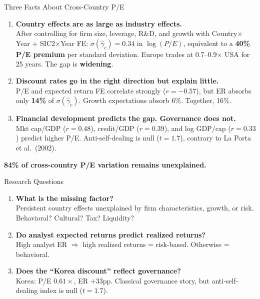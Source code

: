 \documentclass[aspectratio=169, 11pt]{beamer}
\begin{document}
\begin{frame}{Three Facts About Cross-Country P/E}
\vspace{0.1cm}
\begin{enumerate}\setlength\itemsep{8pt}

\item[\textcolor{accent}{\Large 1.}] {\large \textbf{Country effects are as large as industry effects.}}\\[2pt]
\footnotesize After controlling for firm size, leverage, R\&D, and growth with Country$\times$Year + SIC2$\times$Year FE: $\sigma(\hat\gamma_c) = 0.34$ in $\log(P/E)$, equivalent to a \textcolor{alert}{\textbf{40\% P/E premium}} per standard deviation. Europe trades at 0.7--0.9$\times$ USA for 25 years. The gap is \textbf{widening}.

\item[\textcolor{accent}{\Large 2.}] {\large \textbf{Discount rates go in the right direction but explain little.}}\\[2pt]
\footnotesize P/E and expected return FE correlate strongly ($r = -0.57$), but ER absorbs only \textcolor{alert}{\textbf{14\%}} of $\sigma(\hat\gamma_c)$. Growth expectations absorb 6\%. Together, 16\%.

\item[\textcolor{accent}{\Large 3.}] {\large \textbf{Financial development predicts the gap. Governance does not.}}\\[2pt]
\footnotesize Mkt cap/GDP ($r = 0.48$), credit/GDP ($r = 0.39$), and log GDP/cap ($r = 0.33$) predict higher P/E. Anti-self-dealing is null ($t = 1.7$), contrary to La Porta et al.\ (2002).

\end{enumerate}

\vspace{0.15cm}
\centering
\colorbox{alert!15}{\footnotesize \textbf{84\% of cross-country P/E variation remains unexplained.}}
\end{frame}

\begin{frame}{Research Questions}
\small
\begin{enumerate}\setlength\itemsep{2pt}
\item \textbf{What is the missing factor?}\\
{\footnotesize Persistent country effects unexplained by firm characteristics, growth, or risk. Behavioral? Cultural? Tax? Liquidity?}

\item \textbf{Do analyst expected returns predict realized returns?}\\
{\footnotesize High analyst ER $\Rightarrow$ high realized returns = risk-based. Otherwise = behavioral.}

\item \textbf{Does the ``Korea discount'' reflect governance?}\\
{\footnotesize Korea: P/E $0.61\times$, ER $+$33pp. Classical governance story, but anti-self-dealing index is null ($t = 1.7$).}
\end{enumerate}
\end{frame}
\end{document}
